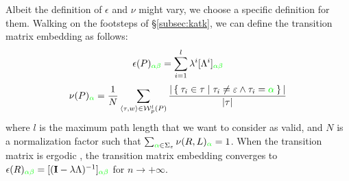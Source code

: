 Albeit the definition of $\epsilon$ and $\nu$ might vary, we choose a specific definition for them. 
Walking on the footsteps of \S\ref{subsec:katk}, we can define the transition matrix embedding as follows:
\begin{equation}\label{eq:epsilon}
\epsilon(P)_{\color{green}\alpha\beta}=\sum_{i=1}^l\lambda^i[\Lambda^i]_{\color{green}\alpha\beta}
\end{equation}
\begin{equation}\label{eq:nu}
\nu(P)_{\color{green}\alpha}=\frac{1}{N}\sum_{\braket{\tau,w}\in\mathcal{W}_p^l(P)}\frac{|\Set{\tau_i\in\tau|\tau_i\neq\varepsilon\wedge \tau_i={\color{green}\alpha}}|}{|\tau|}
\end{equation}
where $l$ is the maximum path length that we want to consider as valid, and $N$ is a normalization factor such that $\sum_{{\color{green}\alpha}\in\Sigma_\varepsilon}\nu(R,L)_{\color{green}\alpha}=1$. When the transition matrix is ergodic \cite{StocasticCC},  the transition matrix embedding converges to $\epsilon(R)_{\color{green}\alpha\beta}=[(\mathbf{I}-\lambda\Lambda)^{-1}]_{\color{green}\alpha\beta}$ \cite{GartnerFW03} for $n\to+\infty$.

